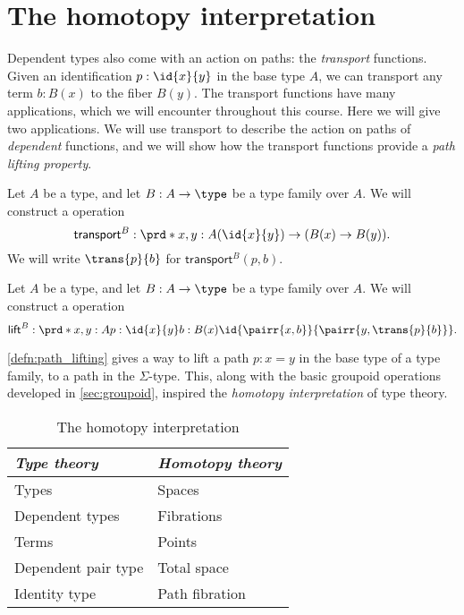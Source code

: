 \section{The homotopy interpretation}

Dependent types also come with an action on paths: the \emph{transport} functions.
Given an identification $p:\id{x}{y}$ in the base type $A$, we can transport any term $b:B(x)$ to the fiber $B(y)$.
The transport functions have many applications, which we will encounter throughout this course.
Here we will give two applications.
We will use transport to describe the action on paths of \emph{dependent} functions, and we will show how the transport functions provide a \emph{path lifting property}. 

\begin{defn}
Let $A$ be a type, and let $B:A\to\type$ be a type family over $A$.
We will construct a  operation
\begin{equation*}
\mathsf{transport}^B:\prd*{x,y:A} (\id{x}{y})\to (B(x)\to B(y)).
\end{equation*}
We will write $\trans{p}{b}$ for $\mathsf{transport}^B(p,b)$.
\end{defn}

\begin{defn}\label{defn:path_lifting}
Let $A$ be a type, and let $B:A\to\type$ be a type family over $A$.
We will construct a  operation
\begin{equation*}
\mathsf{lift}^B : \prd*{x,y:A}{p:\id{x}{y}}{b:B(x)} \id{\pairr{x,b}}{\pairr{y,\trans{p}{b}}}.
\end{equation*}
\end{defn}

\autoref{defn:path_lifting} gives a way to lift a path $p:x=y$ in the base type of a type family, to a path in the $\Sigma$-type. This, along with the basic groupoid operations developed in \autoref{sec:groupoid}, inspired the \emph{homotopy interpretation} of type theory.

\begin{table}
\begin{center}
\caption{The homotopy interpretation}
\begin{tabular}{ll}
\toprule
\emph{Type theory} &  \emph{Homotopy theory} \\
\midrule
Types  & Spaces \\
Dependent types & Fibrations \\
Terms & Points \\
Dependent pair type & Total space \\
Identity type & Path fibration\\
\bottomrule
\end{tabular}
\end{center}
\end{table}

